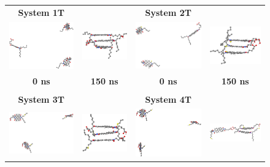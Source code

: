 \begin{figure}[htb]
	\begin{tabular}{cccc}
		\small\textbf{System 1T} &  & \small\textbf{System 2T} &\\
		\includegraphics[width=0.2\columnwidth]{image/T_M1_0ns} & \includegraphics[width=0.2\columnwidth]{image/T_M1_150ns} &
		\includegraphics[width=0.2\columnwidth]{image/T_M2_0ns} & \includegraphics[width=0.2\columnwidth]{image/T_M2_150ns} \\   
		\small\textbf{0 ns} & \small\textbf{150 ns} & \small\textbf{0 ns} & \small\textbf{150 ns} \\
		&&&\\
		\small\textbf{System 3T} &  & \small\textbf{System 4T} &\\
		\includegraphics[width=0.2\columnwidth]{image/T_M3_0ns} & \includegraphics[width=0.2\columnwidth]{image/T_M3_150ns} &
		\includegraphics[width=0.2\columnwidth]{image/T_M4_0ns} & \includegraphics[width=0.2\columnwidth]{image/T_M4_150ns} \\

\end{tabular}
\end{figure}

